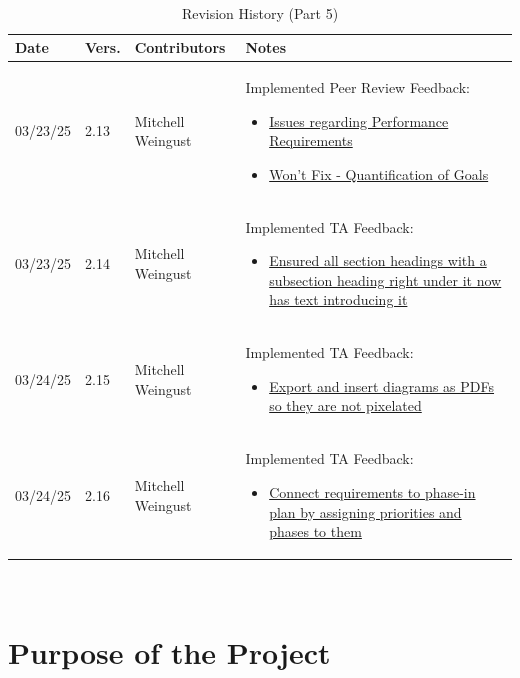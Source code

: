 \documentclass[12pt]{article}
\begin{document}
~\newpage
\begin{table}[H]
  \centering
  \caption{Revision History (Part 5)}
  \label{TblRevisionHistoryPart1}
  \begin{tabularx}{\textwidth}{p{1.5cm} p{1cm} p{3.5cm} X}
      \toprule
      \textbf{Date} & \textbf{Vers.} & \textbf{Contributors} & \textbf{Notes} \\
      \midrule
      03/23/25 & 2.13 & Mitchell Weingust & Implemented Peer Review Feedback:
      \begin{itemize}[leftmargin=*]
        \item \href{https://github.com/parishanizam/TeleHealth/issues/116}{Issues regarding Performance Requirements}
        \item \href{https://github.com/parishanizam/TeleHealth/issues/118}{Won't Fix - Quantification of Goals}
      \end{itemize} \\
      03/23/25 & 2.14 & Mitchell Weingust & Implemented TA Feedback: 
      \begin{itemize}[leftmargin=*]
        \item \href{https://github.com/parishanizam/TeleHealth/issues/191}{Ensured all section headings with a subsection heading right under it now has text introducing it}
      \end{itemize} \\
      03/24/25 & 2.15 & Mitchell Weingust & Implemented TA Feedback: 
      \begin{itemize}[leftmargin=*]
        \item \href{https://github.com/parishanizam/TeleHealth/issues/190}{Export and insert diagrams as PDFs so they are not pixelated}
      \end{itemize} \\
      03/24/25 & 2.16 & Mitchell Weingust & Implemented TA Feedback: 
      \begin{itemize}[leftmargin=*]
        \item \href{https://github.com/parishanizam/TeleHealth/issues/198}{Connect requirements to phase-in plan by assigning priorities and phases to them}
      \end{itemize} \\
    \end{tabularx}
  \end{table}

~\newpage
{}

\section{Purpose of the Project}
\end{document}
